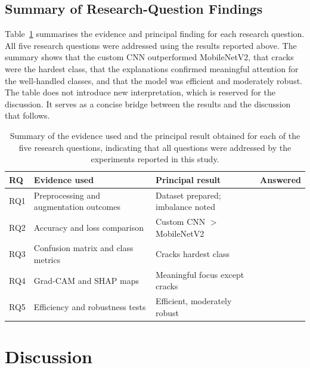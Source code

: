 \documentclass[preprint,12pt]{elsarticle}
\newcommand{\cmark}{\ding{51}}
\begin{document}
\subsection{Summary of Research-Question Findings}

Table~\ref{tab:rq_summary} summarises the evidence and principal finding for each research question.
All five research questions were addressed using the results reported above.
The summary shows that the custom CNN outperformed MobileNetV2, that cracks were the hardest class, that the explanations confirmed meaningful attention for the well-handled classes, and that the model was efficient and moderately robust.
The table does not introduce new interpretation, which is reserved for the discussion.
It serves as a concise bridge between the results and the discussion that follows.

\begin{table}[!ht]
\centering
\caption{Summary of the evidence used and the principal result obtained for each of the five research questions, indicating that all questions were addressed by the experiments reported in this study.}
\label{tab:rq_summary}
\begin{tabular}{p{0.7cm} p{3.3cm} p{3.2cm} c}
\toprule
\textbf{RQ} & \textbf{Evidence used} & \textbf{Principal result} & \textbf{Answered} \\
\midrule
RQ1 & Preprocessing and augmentation outcomes & Dataset prepared; imbalance noted & \cmark \\
RQ2 & Accuracy and loss comparison & Custom CNN $>$ MobileNetV2 & \cmark \\
RQ3 & Confusion matrix and class metrics & Cracks hardest class & \cmark \\
RQ4 & Grad-CAM and SHAP maps & Meaningful focus except cracks & \cmark \\
RQ5 & Efficiency and robustness tests & Efficient, moderately robust & \cmark \\
\bottomrule
\end{tabular}
\end{table}

\section{Discussion}
\label{sec:discussion}
\end{document}
